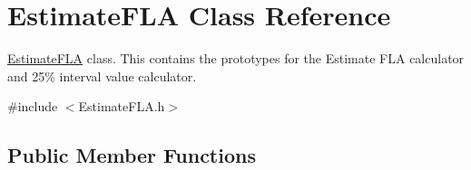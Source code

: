 \hypertarget{class_estimate_f_l_a}{}\section{Estimate\+F\+LA Class Reference}
\label{class_estimate_f_l_a}


\hyperlink{class_estimate_f_l_a}{Estimate\+F\+LA} class. This contains the prototypes for the Estimate F\+LA calculator and 25\% interval value calculator.  




{\ttfamily \#include $<$Estimate\+F\+L\+A.\+h$>$}

\subsection*{Public Member Functions}
